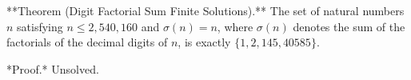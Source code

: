 
**Theorem (Digit Factorial Sum Finite Solutions).** The set of natural numbers $n$ satisfying $n \leq 2{,}540{,}160$ and $\sigma(n) = n$, where $\sigma(n)$ denotes the sum of the factorials of the decimal digits of $n$, is exactly $\{1, 2, 145, 40585\}$.

*Proof.* Unsolved.